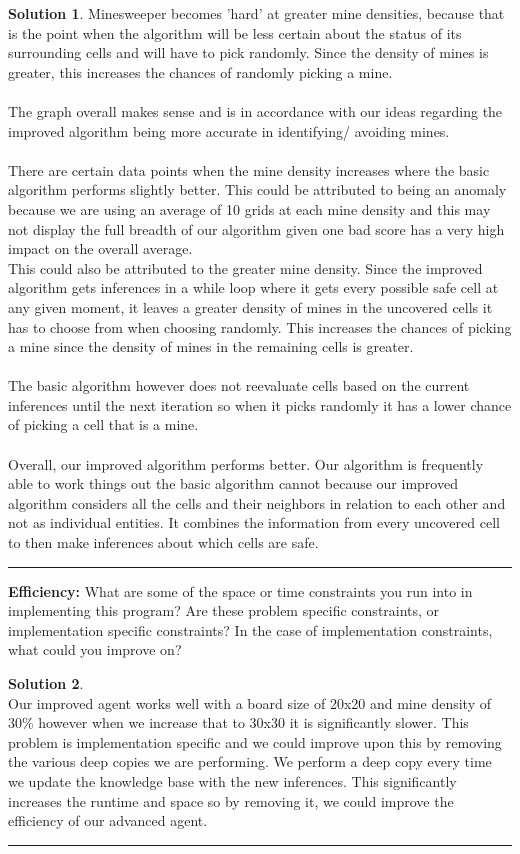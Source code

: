 \documentclass{article}
\theoremstyle{definition}
\def\fline{\rule{0.75\linewidth}{0.5pt}}
\newcommand{\finishline}{\vspace{-15pt}\begin{center}\fline\end{center}}
\newtheorem*{solution*}{Solution}
\newenvironment{solution}{\begin{solution*}}{{\finishline} \end{solution*}}
\begin{document}
\begin{solution}
    Minesweeper becomes 'hard' at greater mine densities, because that is the point when the algorithm will be less certain about the status of its surrounding cells and will have to pick randomly. Since the density of mines is greater, this increases the chances of randomly picking a mine. 
    \\\\
    The graph overall makes sense and is in accordance with our ideas regarding the improved algorithm being more accurate in identifying/ avoiding mines. 
    \\\\
    There are certain data points when the mine density increases where the basic algorithm performs slightly better. This could be attributed to being an anomaly because we are using an average of 10 grids at each mine density and this may not display the full breadth of our algorithm given one bad score has a very high impact on the overall average. \\
    This could also be attributed to the greater mine density. Since the improved algorithm gets inferences in a while loop where it gets every possible safe cell at any given moment, it leaves a greater density of mines in the uncovered cells it has to choose from when choosing randomly. This increases the chances of picking a mine since the density of mines in the remaining cells is greater. 
    \\\\
    The basic algorithm however does not reevaluate cells based on the current inferences until the next iteration so when it picks randomly it has a lower chance of picking a cell that is a mine.
    \\\\
    Overall, our improved algorithm performs better. Our algorithm is frequently able to work things out the basic algorithm cannot because our improved algorithm considers all the cells and their neighbors in relation to each other and not as individual entities. It combines the information from every uncovered cell to then make inferences about which cells are safe. 
	
\end{solution}
\smallskip

\textbf{Efficiency: }
What are some of the space or time constraints you run into in implementing this program? 
Are these problem specific constraints, or implementation specific constraints? 
In the case of implementation constraints, what could you improve on?
\begin{solution} \hfill \\
    Our improved agent works well with a board size of 20x20 and mine density of 30\% however when we increase that to 30x30 it is significantly slower.
    This problem is implementation specific and we could improve upon this by removing the various deep copies we are performing. We perform a deep copy every time we update the knowledge base with the new inferences. This significantly increases the runtime and space so by removing it, we could improve the efficiency of our advanced agent.
\end{solution}
\end{document}

